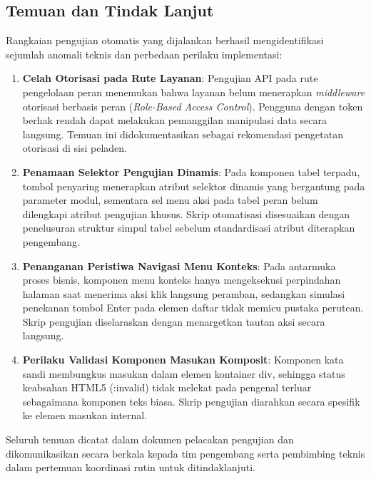 \subsection*{Temuan dan Tindak Lanjut}
Rangkaian pengujian otomatis yang dijalankan berhasil mengidentifikasi sejumlah anomali teknis dan perbedaan perilaku implementasi:
\begin{enumerate}[label=\alph*)]
\item \textbf{Celah Otorisasi pada Rute Layanan}: Pengujian API pada rute pengelolaan peran menemukan bahwa layanan belum menerapkan \textit{middleware} otorisasi berbasis peran (\textit{Role-Based Access Control}). Pengguna dengan token berhak rendah dapat melakukan pemanggilan manipulasi data secara langsung. Temuan ini didokumentasikan sebagai rekomendasi pengetatan otorisasi di sisi peladen.
\item \textbf{Penamaan Selektor Pengujian Dinamis}: Pada komponen tabel terpadu, tombol penyaring menerapkan atribut selektor dinamis yang bergantung pada parameter modul, sementara sel menu aksi pada tabel peran belum dilengkapi atribut pengujian khusus. Skrip otomatisasi disesuaikan dengan penelusuran struktur simpul tabel sebelum standardisasi atribut diterapkan pengembang.
\item \textbf{Penanganan Peristiwa Navigasi Menu Konteks}: Pada antarmuka proses bisnis, komponen menu konteks hanya mengeksekusi perpindahan halaman saat menerima aksi klik langsung peramban, sedangkan simulasi penekanan tombol Enter pada elemen daftar tidak memicu pustaka perutean. Skrip pengujian diselaraskan dengan menargetkan tautan aksi secara langsung.
\item \textbf{Perilaku Validasi Komponen Masukan Komposit}: Komponen kata sandi membungkus masukan dalam elemen kontainer div, sehingga status keabsahan HTML5 (:invalid) tidak melekat pada pengenal terluar sebagaimana komponen teks biasa. Skrip pengujian diarahkan secara spesifik ke elemen masukan internal.
\end{enumerate}

Seluruh temuan dicatat dalam dokumen pelacakan pengujian dan dikomunikasikan secara berkala kepada tim pengembang serta pembimbing teknis dalam pertemuan koordinasi rutin untuk ditindaklanjuti.

